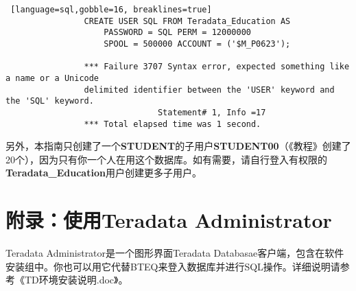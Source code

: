 \documentclass{article}
\begin{document}
			\begin{lstlisting} [language=sql,gobble=16, breaklines=true]
				CREATE USER SQL FROM Teradata_Education AS
					PASSWORD = SQL PERM = 12000000
					SPOOL = 500000 ACCOUNT = ('$M_P0623');

				*** Failure 3707 Syntax error, expected something like a name or a Unicode
				delimited identifier between the 'USER' keyword and the 'SQL' keyword.
				               Statement# 1, Info =17
				*** Total elapsed time was 1 second.
			\end{lstlisting}

			另外，本指南只创建了一个\textbf{STUDENT}的子用户\textbf{STUDENT00}（《教程》创建了20个），因为只有你一个人在用这个数据库。如有需要，请自行登入有权限的\textbf{Teradata\_Education}用户创建更多子用户。

		\section*{附录：使用Teradata Administrator}
			Teradata Administrator是一个图形界面Teradata Databasae客户端，包含在软件安装组中。你也可以用它代替BTEQ来登入数据库并进行SQL操作。详细说明请参考《TD环境安装说明.doc》。

			


		
\end{document}
